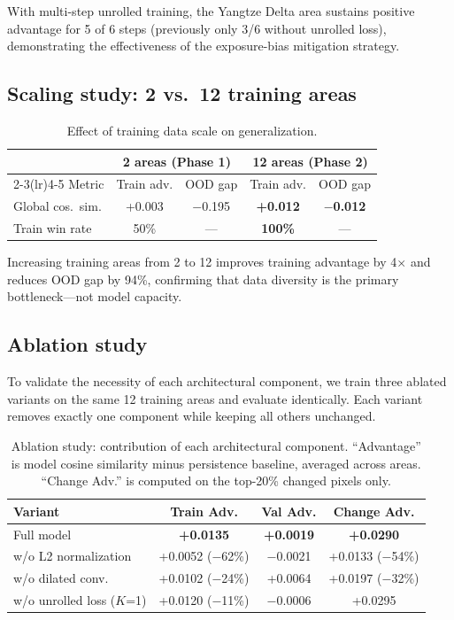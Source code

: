 \documentclass{article}
\begin{document}
With multi-step unrolled training, the Yangtze Delta area sustains positive advantage for 5 of 6 steps (previously only 3/6 without unrolled loss), demonstrating the effectiveness of the exposure-bias mitigation strategy.

\subsection{Scaling study: 2 vs.~12 training areas}
\label{sec:ablation_data}

\begin{table}[htbp]
\centering
\caption{Effect of training data scale on generalization.}
\label{tab:scaling}
\begin{tabular}{lcccc}
\toprule
 & \multicolumn{2}{c}{2 areas (Phase 1)} & \multicolumn{2}{c}{12 areas (Phase 2)} \\
\cmidrule(lr){2-3}\cmidrule(lr){4-5}
Metric & Train adv. & OOD gap & Train adv. & OOD gap \\
\midrule
Global cos.~sim. & +0.003 & $-$0.195 & \textbf{+0.012} & $\mathbf{-}$\textbf{0.012} \\
Train win rate & 50\% & --- & \textbf{100\%} & --- \\
\bottomrule
\end{tabular}
\end{table}

Increasing training areas from 2 to 12 improves training advantage by 4$\times$ and reduces OOD gap by 94\%, confirming that data diversity is the primary bottleneck---not model capacity.

\subsection{Ablation study}
\label{sec:ablation}

To validate the necessity of each architectural component, we train three ablated variants on the same 12 training areas and evaluate identically. Each variant removes exactly one component while keeping all others unchanged.

\begin{table}[htbp]
\centering
\caption{Ablation study: contribution of each architectural component. ``Advantage'' is model cosine similarity minus persistence baseline, averaged across areas. ``Change Adv.'' is computed on the top-20\% changed pixels only.}
\label{tab:ablation}
\begin{tabular}{lccc}
\toprule
Variant & Train Adv. & Val Adv. & Change Adv. \\
\midrule
Full model & \textbf{+0.0135} & \textbf{+0.0019} & \textbf{+0.0290} \\
w/o L2 normalization & +0.0052 ($-$62\%) & $-$0.0021 & +0.0133 ($-$54\%) \\
w/o dilated conv. & +0.0102 ($-$24\%) & +0.0064 & +0.0197 ($-$32\%) \\
w/o unrolled loss ($K$=1) & +0.0120 ($-$11\%) & $-$0.0006 & +0.0295 \\
\bottomrule
\end{tabular}
\end{table}
\end{document}
